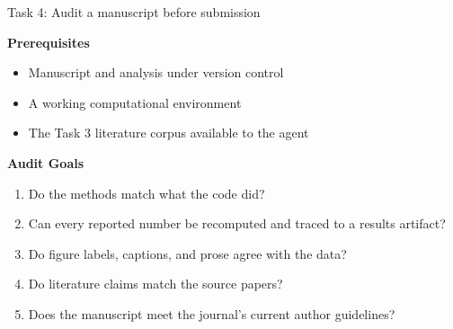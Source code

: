 

\begin{frame}{Task 4: Audit a manuscript before submission}
  \vspace{0.15em}
  {\normalsize
    \textbf{Prerequisites}\par
    \begin{itemize}\normalsize\setlength\itemsep{0.05em}
      \item Manuscript and analysis under version control
      \item A working computational environment
      \item The Task 3 literature corpus available to the agent
    \end{itemize}
  }
  \vspace{0.3em}
  {\large\textbf{Audit Goals}\par}
  \begin{enumerate}\large\setlength\itemsep{0.25em}
    \item Do the methods match what the code did?
    \item Can every reported number be recomputed and traced to a results artifact?
    \item Do figure labels, captions, and prose agree with the data?
    \item Do literature claims match the source papers?
    \item Does the manuscript meet the journal's current author guidelines?
  \end{enumerate}
  \vspace{1.0cm plus 1fill}
\end{frame}


